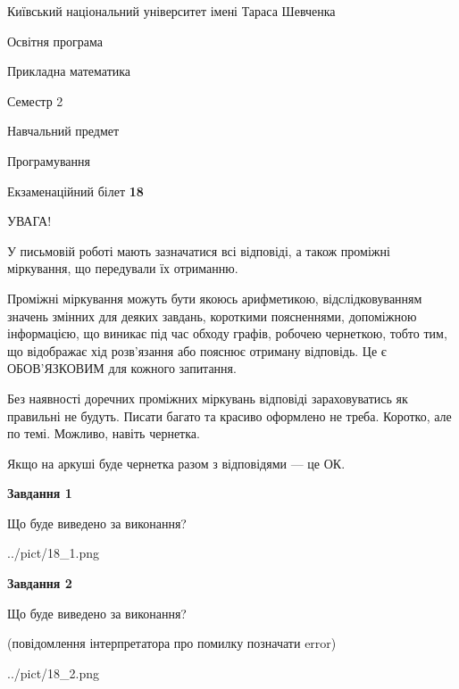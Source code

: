 \documentclass[12pt, ukrainian]{article}
\begin{document}
{{\begin {small}\par
{ \center  Київський національний університет імені Тараса Шевченка \par}
{\parbox {5 cm}{Освітня програма \hfill}{\parbox {7 cm}{Прикладна математика\hfill}}\parbox {6 cm}{\hfill Семестр 2}}\par
{\parbox {5 cm} {Навчальний предмет \hfill}\parbox {7 cm}{Програмування \hfill}\parbox {6cm}{\hfill}\par}\vspace{-7pt} \end{small}}{\center Екзаменаційний білет \No \textbf
{ 18 }\par}}
{
\begin {large}
УВАГА!

У письмовій роботі мають зазначатися всі відповіді, а також проміжні міркування, що передували їх отриманню.

Проміжні міркування можуть бути якоюсь арифметикою, відслідковуванням зна\-чень змінних для деяких завдань,
короткими поясненнями, допоміжною інформацією, що виникає під час обходу графів, робочею чернеткою,
тобто тим, що відображає хід розв’язання або пояснює отриману відповідь.
Це є ОБОВ’ЯЗКОВИМ для кожного запитання.

Без наявності доречних проміжних міркувань відповіді зараховуватись як правиль\-ні не будуть.
Писати багато та красиво оформлено не треба. Коротко, але по темі. Можли\-во, навіть чернетка.

Якщо на аркуші буде чернетка разом з відповідями --- це ОК.

\newpage

{\begin {center}\textbf{Завдання 1}\end {center}}\par
Що буде виведено за виконання?\par
\begin{center}
	{../pict/18_1.png}
\end{center}
\newpage

{\begin {center}\textbf{Завдання 2}\end {center}}\par
Що буде виведено за виконання?\par
 (повідомлення інтерпретатора про помилку позначати error)\par
\begin{center}
	{../pict/18_2.png}
\end{center}
\newpage


\end{large}}
\end{document}
